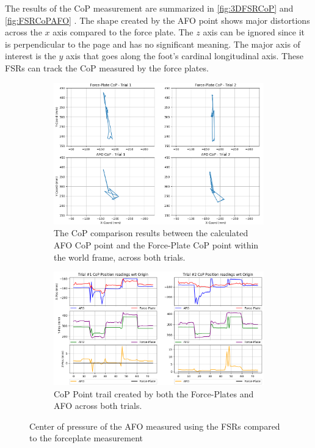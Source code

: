 The results of the CoP measurement are summarized in \autoref{fig:3DFSRCoP} and \autoref{fig:FSRCoPAFO} . The shape created by the AFO point shows major distortions across the $x$ axis compared to the force plate. The $z$ axis can be ignored since it is perpendicular to the page and has no significant meaning. The major axis of interest is the $y$ axis that goes along the foot's cardinal longitudinal axis. These FSRs can track the CoP measured by the force plates. 


\begin{figure}[h!]
    \centering
    \begin{subfigure}{0.5\linewidth}
        \captionsetup{justification=centering}
        \centerline{ \includegraphics[scale=0.35]{images/mech_design/SoleSensorV3_CoPComparison_2D_XYplane.png}}
        \caption[CoP comparison]{The CoP comparison results between the calculated AFO CoP point and the Force-Plate CoP point within the world frame, across both trials.}
        \label{fig:3DFSRCoP}
    \end{subfigure}%
    \vspace{1cm}
    \begin{subfigure}{.5\linewidth}
        \captionsetup{justification=centering}
        \centerline{\includegraphics[scale=0.35]{images/mech_design/SoleSensorV3_CoPComparison_BothTrials.png}}
        \caption[CoP Point Trail ]{CoP Point trail created by both the Force-Plates and AFO across both trials. }
        \label{fig:FSRCoPAFO}
    \end{subfigure}%
    \caption[Center of Pressure of the AFO]{Center of pressure of the AFO measured using the FSRs compared to the forceplate measurement \cite{Michaels2020}}
    \label{fig:CoPAFO}
\end{figure}



